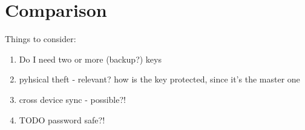 \section{Comparison}
\label{chapter:comparison}

Things to consider:

\begin{enumerate}
	\item Do I need two or more (backup?) keys
	\item pyhsical theft - relevant? how is the key protected, since it's the master one
	\item cross device sync - possible?!
	\item TODO password safe?!
\end{enumerate}